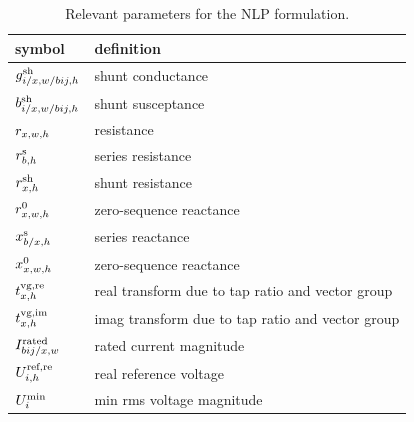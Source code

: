 \documentclass[journal]{IEEEtran}
\begin{document}
\begin{table}[H]
    \centering
    \caption{Relevant parameters for the NLP formulation.}
    \label{tab:parameters_nlp}
    \begin{tabular}{l l }
        symbol                                                                      & definition                                        \\ \hline
        $g_{i/\text{$x$,}w/bij,h}^{\text{sh}}$     & shunt conductance                                 \\
        $b_{i/\text{$x$,}w/bij,h}^{\text{sh}}$     & shunt susceptance                                 \\
        $r_{x,w,h}$                                    & resistance                                        \\
        $r_{b,h}^{\text{s}}$                                        & series resistance                                 \\
        $r_{x,h}^{\text{sh}}$                                         & shunt resistance                                  \\
        $r^{\text{0}}_{x,w,h}$                         & zero-sequence reactance                           \\
        $x_{b/x,h}^{\text{s}}$                                   & series reactance                                  \\
        $x^{\text{0}}_{x,w,h}$                          & zero-sequence reactance                           \\ \hline
        $t^{\text{vg,re}}_{x,h}$                               & real transform due to tap ratio and vector group  \\
        $t^{\text{vg,im}}_{x,h}$                          & imag transform due to tap ratio and vector group  \\ \hline
        $I^{\text{rated}}_{bij/x,w}$                                 & rated current magnitude                           \\ \hline 
        $U^{\text{ref,re}}_{i,h}$                                         & real reference voltage                            \\
        $U^{\text{min}}_{i}$                                                   & min rms voltage magnitude                         \\

\end{tabular}
\end{table}
\end{document}
